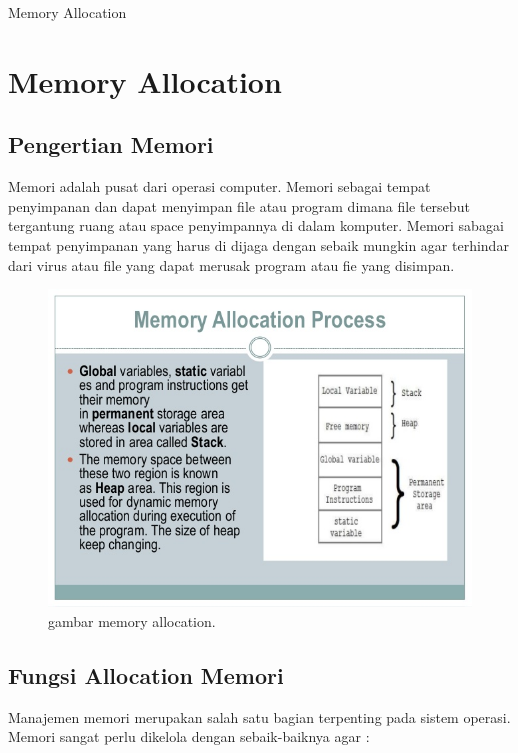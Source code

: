 
Memory Allocation

\section {Memory Allocation}

\subsection {Pengertian Memori}

Memori adalah pusat dari operasi computer. Memori sebagai tempat penyimpanan dan dapat menyimpan file atau program dimana file tersebut tergantung ruang atau space penyimpannya di dalam komputer. Memori sabagai tempat penyimpanan yang harus di dijaga dengan sebaik mungkin agar terhindar dari virus atau file yang dapat merusak program atau fie yang disimpan.

\begin{figure}[ht]
\centerline{\includegraphics[width=1\textwidth]{figures/memory_allocation.jpg}}
\caption{gambar memory allocation.}
\label{memory allocation}
\end{figure}


\subsection {Fungsi Allocation Memori}


Manajemen memori merupakan salah satu bagian terpenting pada sistem operasi. Memori sangat perlu dikelola dengan sebaik-baiknya agar :

